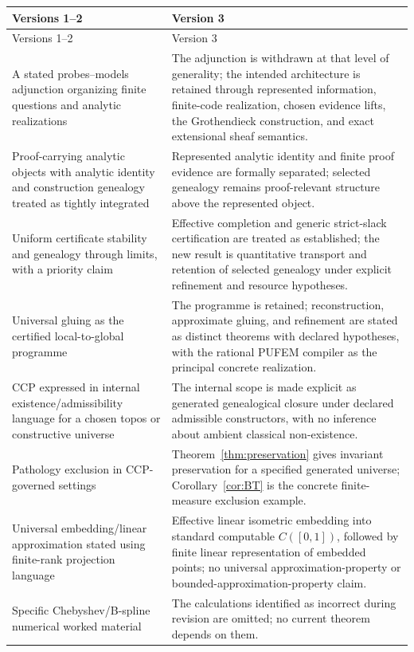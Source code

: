 \documentclass[11pt]{article}
\theoremstyle{definition}
\begin{document}
\renewcommand{\arraystretch}{1.15}
\begin{longtable}{>{\raggedright\arraybackslash}p{} >{\raggedright\arraybackslash}p{}}
\toprule
Versions 1--2 & Version 3 \\
\midrule
\endfirsthead
\toprule
Versions 1--2 & Version 3 \\
\midrule
\endhead
\midrule
\endfoot
\bottomrule
\endlastfoot
A stated probes--models adjunction organizing finite questions and analytic realizations & The adjunction is withdrawn at that level of generality; the intended architecture is retained through represented information, finite-code realization, chosen evidence lifts, the Grothendieck construction, and exact extensional sheaf semantics.\\
Proof-carrying analytic objects with analytic identity and construction genealogy treated as tightly integrated & Represented analytic identity and finite proof evidence are formally separated; selected genealogy remains proof-relevant structure above the represented object.\\
Uniform certificate stability and genealogy through limits, with a priority claim & Effective completion and generic strict-slack certification are treated as established; the new result is quantitative transport and retention of selected genealogy under explicit refinement and resource hypotheses.\\
Universal gluing as the certified local-to-global programme & The programme is retained; reconstruction, approximate gluing, and refinement are stated as distinct theorems with declared hypotheses, with the rational PUFEM compiler as the principal concrete realization.\\
CCP expressed in internal existence/admissibility language for a chosen topos or constructive universe & The internal scope is made explicit as generated genealogical closure under declared admissible constructors, with no inference about ambient classical non-existence.\\
Pathology exclusion in CCP-governed settings & Theorem~\ref{thm:preservation} gives invariant preservation for a specified generated universe; Corollary~\ref{cor:BT} is the concrete finite-measure exclusion example.\\
Universal embedding/linear approximation stated using finite-rank projection language & Effective linear isometric embedding into standard computable $C([0,1])$, followed by finite linear representation of embedded points; no universal approximation-property or bounded-approximation-property claim.\\
Specific Chebyshev/B-spline numerical worked material & The calculations identified as incorrect during revision are omitted; no current theorem depends on them.\\
\end{longtable}
\renewcommand{\arraystretch}{1.0}
\end{document}
